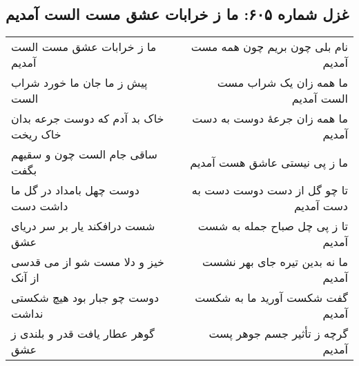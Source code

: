 \begin{center}
\section*{غزل شماره ۶۰۵: ما ز خرابات عشق مست الست آمدیم}
\label{sec:605}
\begin{longtable}{l p{0.5cm} r}
ما ز خرابات عشق مست الست آمدیم
&&
نام بلی چون بریم چون همه مست آمدیم
\\
پیش ز ما جان ما خورد شراب الست
&&
ما همه زان یک شراب مست الست آمدیم
\\
خاک بد آدم که دوست جرعه بدان خاک ریخت
&&
ما همه زان جرعهٔ دوست به دست آمدیم
\\
ساقی جام الست چون و سقیهم بگفت
&&
ما ز پی نیستی عاشق هست آمدیم
\\
دوست چهل بامداد در گل ما داشت دست
&&
تا چو گل از دست دوست دست به دست آمدیم
\\
شست درافکند یار بر سر دریای عشق
&&
تا ز پی چل صباح جمله به شست آمدیم
\\
خیز و دلا مست شو از می قدسی از آنک
&&
ما نه بدین تیره جای بهر نشست آمدیم
\\
دوست چو جبار بود هیچ شکستی نداشت
&&
گفت شکست آورید ما به شکست آمدیم
\\
گوهر عطار یافت قدر و بلندی ز عشق
&&
گرچه ز تأثیر جسم جوهر پست آمدیم
\\
\end{longtable}
\end{center}
